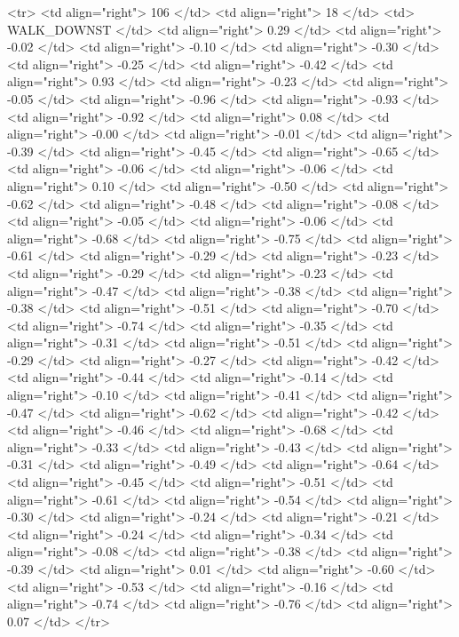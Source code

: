   <tr> <td align="right"> 106 </td> <td align="right">  18 </td> <td> WALK_DOWNST </td> <td align="right"> 0.29 </td> <td align="right"> -0.02 </td> <td align="right"> -0.10 </td> <td align="right"> -0.30 </td> <td align="right"> -0.25 </td> <td align="right"> -0.42 </td> <td align="right"> 0.93 </td> <td align="right"> -0.23 </td> <td align="right"> -0.05 </td> <td align="right"> -0.96 </td> <td align="right"> -0.93 </td> <td align="right"> -0.92 </td> <td align="right"> 0.08 </td> <td align="right"> -0.00 </td> <td align="right"> -0.01 </td> <td align="right"> -0.39 </td> <td align="right"> -0.45 </td> <td align="right"> -0.65 </td> <td align="right"> -0.06 </td> <td align="right"> -0.06 </td> <td align="right"> 0.10 </td> <td align="right"> -0.50 </td> <td align="right"> -0.62 </td> <td align="right"> -0.48 </td> <td align="right"> -0.08 </td> <td align="right"> -0.05 </td> <td align="right"> -0.06 </td> <td align="right"> -0.68 </td> <td align="right"> -0.75 </td> <td align="right"> -0.61 </td> <td align="right"> -0.29 </td> <td align="right"> -0.23 </td> <td align="right"> -0.29 </td> <td align="right"> -0.23 </td> <td align="right"> -0.47 </td> <td align="right"> -0.38 </td> <td align="right"> -0.38 </td> <td align="right"> -0.51 </td> <td align="right"> -0.70 </td> <td align="right"> -0.74 </td> <td align="right"> -0.35 </td> <td align="right"> -0.31 </td> <td align="right"> -0.51 </td> <td align="right"> -0.29 </td> <td align="right"> -0.27 </td> <td align="right"> -0.42 </td> <td align="right"> -0.44 </td> <td align="right"> -0.14 </td> <td align="right"> -0.10 </td> <td align="right"> -0.41 </td> <td align="right"> -0.47 </td> <td align="right"> -0.62 </td> <td align="right"> -0.42 </td> <td align="right"> -0.46 </td> <td align="right"> -0.68 </td> <td align="right"> -0.33 </td> <td align="right"> -0.43 </td> <td align="right"> -0.31 </td> <td align="right"> -0.49 </td> <td align="right"> -0.64 </td> <td align="right"> -0.45 </td> <td align="right"> -0.51 </td> <td align="right"> -0.61 </td> <td align="right"> -0.54 </td> <td align="right"> -0.30 </td> <td align="right"> -0.24 </td> <td align="right"> -0.21 </td> <td align="right"> -0.24 </td> <td align="right"> -0.34 </td> <td align="right"> -0.08 </td> <td align="right"> -0.38 </td> <td align="right"> -0.39 </td> <td align="right"> 0.01 </td> <td align="right"> -0.60 </td> <td align="right"> -0.53 </td> <td align="right"> -0.16 </td> <td align="right"> -0.74 </td> <td align="right"> -0.76 </td> <td align="right"> 0.07 </td> </tr>
